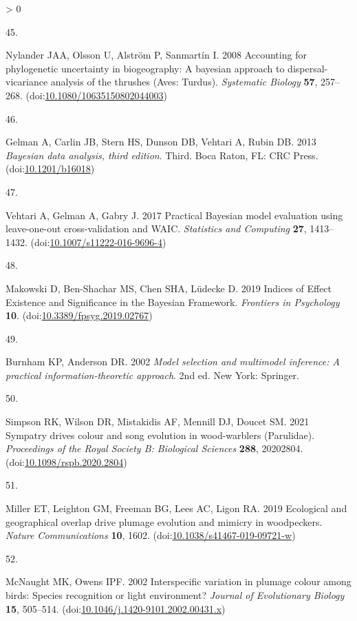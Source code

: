 \documentclass[
  a4paper,
]{article}
\newlength{\cslhangindent}
\newlength{\csllabelwidth}
\newenvironment{CSLReferences}[2] %
 {%
  \setlength{\parindent}{0pt}
  \ifodd #1 \everypar{\setlength{\hangindent}{\cslhangindent}}\ignorespaces\fi
  \ifnum #2 > 0
  \setlength{\parskip}{#2\baselineskip}
  \fi
 }%
 {}
\newcommand{\CSLLeftMargin}[1]{\parbox[t]{\csllabelwidth}{#1}}
\newcommand{\CSLRightInline}[1]{\parbox[t]{\linewidth - \csllabelwidth}{#1}\break}
\begin{document}
\begin{CSLReferences}{0}{0}
\leavevmode\hypertarget{ref-nylander2008}{}%
\CSLLeftMargin{45. }
\CSLRightInline{Nylander JAA, Olsson U, Alström P, Sanmartín I. 2008
Accounting for phylogenetic uncertainty in biogeography: {A} bayesian
approach to dispersal-vicariance analysis of the thrushes ({Aves}:
{Turdus}). \emph{Systematic Biology} \textbf{57}, 257--268.
(doi:\href{https://doi.org/10.1080/10635150802044003}{10.1080/10635150802044003})}

\leavevmode\hypertarget{ref-gelman2013}{}%
\CSLLeftMargin{46. }
\CSLRightInline{Gelman A, Carlin JB, Stern HS, Dunson DB, Vehtari A,
Rubin DB. 2013 \emph{Bayesian data analysis, third edition}. Third.
{Boca Raton, FL}: {CRC Press}.
(doi:\href{https://doi.org/10.1201/b16018}{10.1201/b16018})}

\leavevmode\hypertarget{ref-vehtari2017}{}%
\CSLLeftMargin{47. }
\CSLRightInline{Vehtari A, Gelman A, Gabry J. 2017 Practical {Bayesian}
model evaluation using leave-one-out cross-validation and {WAIC}.
\emph{Statistics and Computing} \textbf{27}, 1413--1432.
(doi:\href{https://doi.org/10.1007/s11222-016-9696-4}{10.1007/s11222-016-9696-4})}

\leavevmode\hypertarget{ref-makowski2019}{}%
\CSLLeftMargin{48. }
\CSLRightInline{Makowski D, Ben-Shachar MS, Chen SHA, Lüdecke D. 2019
Indices of {Effect Existence} and {Significance} in the {Bayesian
Framework}. \emph{Frontiers in Psychology} \textbf{10}.
(doi:\href{https://doi.org/10.3389/fpsyg.2019.02767}{10.3389/fpsyg.2019.02767})}

\leavevmode\hypertarget{ref-burnham2002}{}%
\CSLLeftMargin{49. }
\CSLRightInline{Burnham KP, Anderson DR. 2002 \emph{Model selection and
multimodel inference: {A} practical information-theoretic approach}. 2nd
ed. {New York}: {Springer}. }

\leavevmode\hypertarget{ref-simpson2021}{}%
\CSLLeftMargin{50. }
\CSLRightInline{Simpson RK, Wilson DR, Mistakidis AF, Mennill DJ, Doucet
SM. 2021 Sympatry drives colour and song evolution in wood-warblers
({Parulidae}). \emph{Proceedings of the Royal Society B: Biological
Sciences} \textbf{288}, 20202804.
(doi:\href{https://doi.org/10.1098/rspb.2020.2804}{10.1098/rspb.2020.2804})}

\leavevmode\hypertarget{ref-miller2019}{}%
\CSLLeftMargin{51. }
\CSLRightInline{Miller ET, Leighton GM, Freeman BG, Lees AC, Ligon RA.
2019 Ecological and geographical overlap drive plumage evolution and
mimicry in woodpeckers. \emph{Nature Communications} \textbf{10}, 1602.
(doi:\href{https://doi.org/10.1038/s41467-019-09721-w}{10.1038/s41467-019-09721-w})}

\leavevmode\hypertarget{ref-mcnaught2002}{}%
\CSLLeftMargin{52. }
\CSLRightInline{McNaught MK, Owens IPF. 2002 Interspecific variation in
plumage colour among birds: {Species} recognition or light environment?
\emph{Journal of Evolutionary Biology} \textbf{15}, 505--514.
(doi:\href{https://doi.org/10.1046/j.1420-9101.2002.00431.x}{10.1046/j.1420-9101.2002.00431.x})}

\end{CSLReferences}
\end{document}
